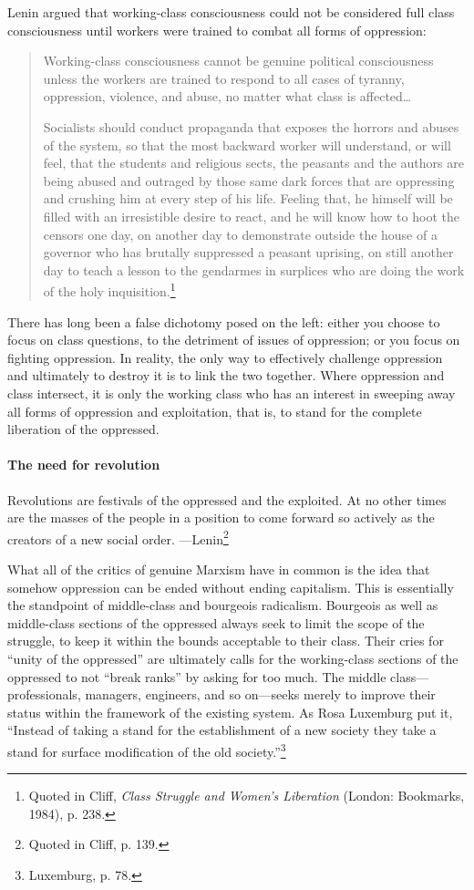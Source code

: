 Lenin argued that working-class consciousness could not be considered full class consciousness until workers were trained to combat all forms of oppression:

\blockquote{Working-class consciousness cannot be genuine political consciousness unless the workers are trained to respond to all cases of tyranny, oppression, violence, and abuse, no matter what class is affected\ldots

Socialists should conduct propaganda that exposes the horrors and abuses of the system, so that the most backward worker will understand, or will feel, that the students and religious sects, the peasants and the authors are being abused and outraged by those same dark forces that are oppressing and crushing him at every step of his life. Feeling that, he himself will be filled with an irresistible desire to react, and he will know how to hoot the censors one day, on another day to demonstrate outside the house of a governor who has brutally suppressed a peasant uprising, on still another day to teach a lesson to the gendarmes in surplices who are doing the work of the holy inquisition.\footnote{Quoted in Cliff, \emph{Class Struggle and Women's Liberation} (London: Bookmarks, 1984), p. 238.}}

There has long been a false dichotomy posed on the left: either you choose to focus on class questions, to the detriment of issues of oppression; or you focus on fighting oppression. In reality, the only way to effectively challenge oppression and ultimately to destroy it is to link the two together. Where oppression and class intersect, it is only the working class who has an interest in sweeping away all forms of oppression and exploitation, that is, to stand for the complete liberation of the oppressed.

\paragraph{The need for revolution}

\begin{displayquote}
Revolutions are festivals of the oppressed and the exploited. At no other times are the masses of the people in a position to come forward so actively as the creators of a new social order.
---Lenin\footnote{Quoted in Cliff, p. 139.}
\end{displayquote}

What all of the critics of genuine Marxism have in common is the idea that somehow oppression can be ended without ending capitalism. This is essentially the standpoint of middle-class and bourgeois radicalism. Bourgeois as well as middle-class sections of the oppressed always seek to limit the scope of the struggle, to keep it within the bounds acceptable to their class. Their cries for ``unity of the oppressed'' are ultimately calls for the working-class sections of the oppressed to not ``break ranks'' by asking for too much. The middle class---professionals, managers, engineers, and so on---seeks merely to improve their status within the framework of the existing system. As Rosa Luxemburg put it, ``Instead of taking a stand for the establishment of a new society they take a stand for surface modification of the old society.''\footnote{Luxemburg, p. 78.}

